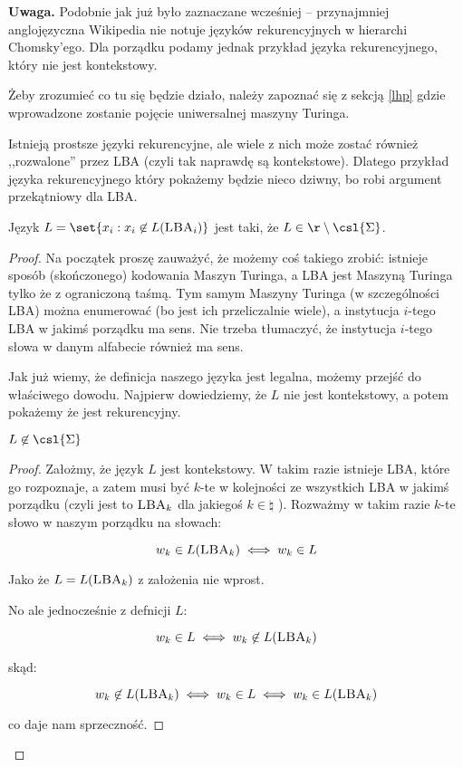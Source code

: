 \textbf{Uwaga.} Podobnie jak już było zaznaczane wcześniej -- przynajmniej anglojęzyczna Wikipedia nie notuje języków rekurencyjnych w hierarchi Chomsky'ego. Dla porządku podamy jednak przykład języka rekurencyjnego, który nie jest kontekstowy.

Żeby zrozumieć co tu się będzie działo, należy zapoznać się z sekcją \ref{lhp} gdzie wprowadzone zostanie pojęcie uniwersalnej maszyny Turinga.

Istnieją prostsze języki rekurencyjne, ale wiele z nich może zostać również ,,rozwalone'' przez LBA (czyli tak naprawdę są kontekstowe). Dlatego przykład języka rekurencyjnego który pokażemy będzie nieco dziwny, bo robi argument przekątniowy dla LBA.

\begin{theorem}
	Język \( L = \set{x_i : x_i \not \in L(\textsc{LBA}_i)} \) jest taki, że \( L \in \r \setminus \csl{\Sigma}\).
\end{theorem}
\begin{proof}
	Na początek proszę zauważyć, że możemy coś takiego zrobić: istnieje sposób (skończonego) kodowania Maszyn Turinga, a LBA jest Maszyną Turinga tylko że z ograniczoną taśmą. Tym samym Maszyny Turinga (w szczególności LBA) można enumerować (bo jest ich przeliczalnie wiele), a instytucja \(i\)-tego LBA w jakimś porządku ma sens. Nie trzeba tłumaczyć, że instytucja \(i\)-tego słowa w danym alfabecie również ma sens.

	Jak już wiemy, że definicja naszego języka jest legalna, możemy przejść do właściwego dowodu. Najpierw dowiedziemy, że \(L\) nie jest kontekstowy, a potem pokażemy że jest rekurencyjny.

	\begin{lemma}
		\( L \not \in \csl{\Sigma}\)
	\end{lemma}
	\begin{proof}
		Założmy, że język \(L\) jest kontekstowy. W takim razie istnieje LBA, które go rozpoznaje, a zatem musi być \(k\)-te w kolejności ze wszystkich LBA w jakimś porządku (czyli jest to \( \textsc{LBA}_k \) dla jakiegoś \(k \in \natural \) ). Rozważmy w takim razie \(k\)-te słowo w naszym porządku na słowach:

		\[ w_k \in L(\textsc{LBA}_k) \iff w_k \in L \]

		Jako że \( L = L(\textsc{LBA}_k) \) z założenia nie wprost.

		No ale jednocześnie z defnicji \(L\):

		\[
			w_k \in L  \iff w_k \not \in  L(\textsc{LBA}_k)
		\]

		skąd:

		\[
			w_k \not \in  L(\textsc{LBA}_k) \iff w_k \in L \iff w_k \in L(\textsc{LBA}_k)
		\]

		co daje nam sprzeczność.
	\end{proof}
\end{proof}

